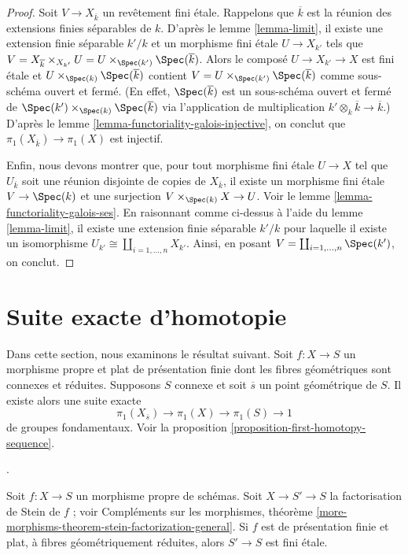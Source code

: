 \begin{proof}
\medskip\noindent
Soit $V \to X_{\overline{k}}$ un revêtement fini \'etale. Rappelons que
$\overline{k}$ est la réunion des extensions finies séparables de $k$.
D'après le lemme \ref{lemma-limit}, il existe une extension finie séparable $k'/k$
et un morphisme fini \'etale $U \to X_{k'}$ tels que
$V = X_{\overline{k}} \times_{X_{k'}} U =
U \times_{\Spec(k')} \Spec(\overline{k})$.
Alors le composé $U \to X_{k'} \to X$ est fini \'etale
et $U \times_{\Spec(k)} \Spec(\overline{k})$
contient $V = U \times_{\Spec(k')} \Spec(\overline{k})$
comme sous-schéma ouvert et fermé. (En effet, $\Spec(\overline{k})$
est un sous-schéma ouvert et fermé de
$\Spec(k') \times_{\Spec(k)} \Spec(\overline{k})$ via
l'application de multiplication $k' \otimes_k \overline{k} \to \overline{k}$.) D'après le
lemme \ref{lemma-functoriality-galois-injective},
on conclut que $\pi_1(X_{\overline{k}}) \to \pi_1(X)$ est injectif.

\medskip\noindent
Enfin, nous devons montrer que, pour tout morphisme fini \'etale
$U \to X$ tel que $U_{\overline{k}}$ soit une réunion disjointe
de copies de $X_{\overline{k}}$, il existe un morphisme fini \'etale
$V \to \Spec(k)$ et une surjection $V \times_{\Spec(k)} X \to U$.
Voir le lemme \ref{lemma-functoriality-galois-ses}.
En raisonnant comme ci-dessus à l'aide du lemme \ref{lemma-limit},
il existe une extension finie séparable $k'/k$
pour laquelle il existe un isomorphisme
$U_{k'} \cong \coprod_{i = 1, \ldots, n} X_{k'}$.
Ainsi, en posant $V = \coprod_{i = 1, \ldots, n} \Spec(k')$,
on conclut.
\end{proof}






\section{Suite exacte d'homotopie}
\label{section-homotopy-exact-sequence}

\noindent
Dans cette section, nous examinons le résultat suivant.
Soit $f : X \to S$ un morphisme propre et plat de
présentation finie dont les
fibres géométriques sont connexes et réduites.
Supposons $S$ connexe et soit $\overline{s}$
un point géométrique de $S$. Il existe alors une suite
exacte
$$
\pi_1(X_{\overline{s}}) \to \pi_1(X) \to \pi_1(S) \to 1
$$
de groupes fondamentaux. Voir la
proposition \ref{proposition-first-homotopy-sequence}.

\begin{lemma}
\label{lemma-stein-factorization-etale}
\begin{reference}
\cite[Expose X, Proposition 1.2, p. 262]{SGA1}.
\end{reference}
Soit $f : X \to S$ un morphisme propre de schémas.
Soit $X \to S' \to S$ la factorisation de Stein de $f$ ; voir
Compléments sur les morphismes, théorème
\ref{more-morphisms-theorem-stein-factorization-general}.
Si $f$ est de présentation finie et plat, à fibres géométriquement
réduites, alors $S' \to S$ est fini \'etale.
\end{lemma}

